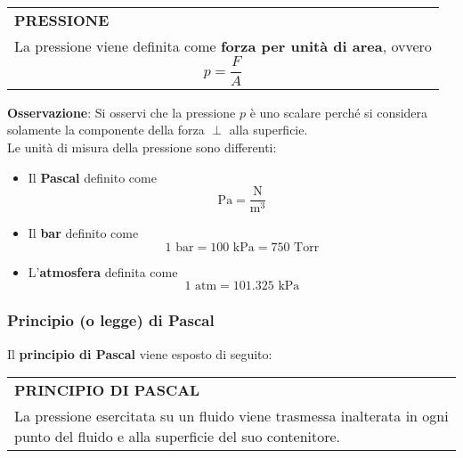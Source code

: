 \documentclass[a4paper]{extarticle}
\renewcommand\arraystretch{}
\begin{document}
\vspace{1em}
\setlength{\tabcolsep}{14pt}
\renewcommand{\arraystretch}{2}
\noindent
\begin{tabularx}{\textwidth}{@{}|P|@{}}
    \hline
    {\textbf{PRESSIONE}}\\
    \parbox{\linewidth}{La pressione viene definita come \textbf{forza per unità di area}, ovvero
    \[\boxed{p = \frac{F}{A}}\]
    \vspace{-1mm}}\\
    \hline
\end{tabularx}

\vspace{1em}
\noindent
\textbf{Osservazione}: Si osservi che la pressione $p$ è uno scalare perché si considera solamente la componente della forza $\perp$ alla superficie.\\
Le unità di misura della pressione sono differenti:
\begin{itemize}
  \item Il \textbf{Pascal} definito come
  \[\boxed{\text{Pa} = \frac{\text{N}}{\text{m}^3}}\]
  \item Il \textbf{bar} definito come
  \[\boxed{1 \text{ bar} = 100 \text{ kPa} = 750 \text{ Torr}}\]
  \item L'\textbf{atmosfera} definita come
  \[\boxed{1 \text{ atm} = 101.325 \text{ kPa}}\]
\end{itemize}

\vspace{1em}
\subsubsection{Principio (o legge) di Pascal}
Il \textbf{principio di Pascal} viene esposto di seguito:

\vspace{1em}
\setlength{\tabcolsep}{14pt}
\renewcommand{\arraystretch}{2}
\noindent
\begin{tabularx}{\textwidth}{@{}|P|@{}}
    \hline
    {\textbf{PRINCIPIO DI PASCAL}}\\
    \parbox{\linewidth}{La pressione esercitata su un fluido viene trasmessa inalterata in ogni punto del fluido e alla superficie del suo contenitore.\vspace{3mm}}\\
    \hline
\end{tabularx}
\end{document}

